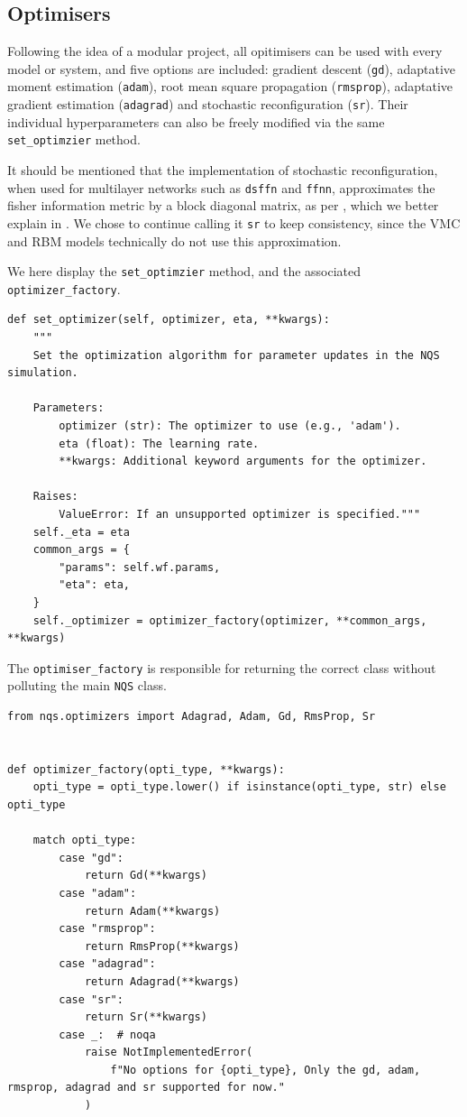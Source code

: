 \subsection{Optimisers}
Following the idea of a modular project, all opitimisers can be used with every model or system, and five options are included: gradient descent (\verb|gd|), adaptative moment estimation (\verb|adam|), root mean square propagation (\verb|rmsprop|), adaptative gradient estimation (\verb|adagrad|) and stochastic reconfiguration (\verb|sr|). Their individual hyperparameters can also be freely modified via the same \verb|set_optimzier| method. 

It should be mentioned that the implementation of stochastic reconfiguration, when used for multilayer networks such as \verb|dsffn| and \verb|ffnn|, approximates the fisher information metric by a block diagonal matrix, as
per \cite{martens2015optimizing}, which we better explain in . We chose to continue calling it \verb|sr| to keep consistency, since the VMC and RBM models technically do not use this approximation.

We here display the \verb|set_optimzier| method, and the associated \verb|optimizer_factory|.
\begin{lstlisting}
def set_optimizer(self, optimizer, eta, **kwargs):
    """
    Set the optimization algorithm for parameter updates in the NQS simulation.

    Parameters:
        optimizer (str): The optimizer to use (e.g., 'adam').
        eta (float): The learning rate.
        **kwargs: Additional keyword arguments for the optimizer.

    Raises:
        ValueError: If an unsupported optimizer is specified."""
    self._eta = eta
    common_args = {
        "params": self.wf.params,
        "eta": eta,
    }
    self._optimizer = optimizer_factory(optimizer, **common_args, **kwargs)
\end{lstlisting}

The \verb|optimiser_factory| is responsible for returning the correct class without polluting the main \verb|NQS| class.

\begin{lstlisting}
from nqs.optimizers import Adagrad, Adam, Gd, RmsProp, Sr


def optimizer_factory(opti_type, **kwargs):
    opti_type = opti_type.lower() if isinstance(opti_type, str) else opti_type

    match opti_type:
        case "gd":
            return Gd(**kwargs)
        case "adam":
            return Adam(**kwargs)
        case "rmsprop":
            return RmsProp(**kwargs)
        case "adagrad":
            return Adagrad(**kwargs)
        case "sr":
            return Sr(**kwargs)
        case _:  # noqa
            raise NotImplementedError(
                f"No options for {opti_type}, Only the gd, adam, rmsprop, adagrad and sr supported for now."
            )
\end{lstlisting}


